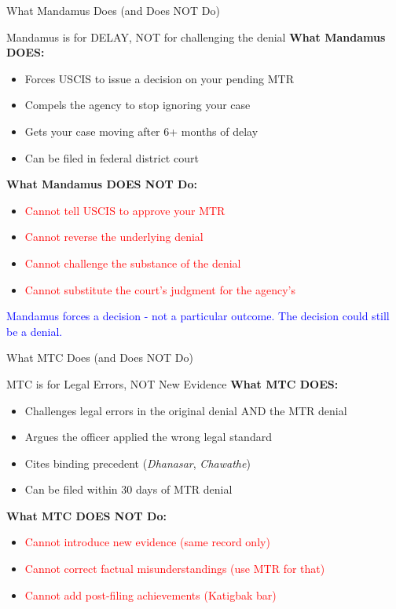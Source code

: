 \documentclass[11pt]{beamer}
\begin{document}
	\begin{frame}{What Mandamus Does (and Does NOT Do)}
		\scriptsize
		\begin{block}{Mandamus is for DELAY, NOT for challenging the denial}
			\textbf{What Mandamus DOES:}
			\begin{itemize}
				\item Forces USCIS to issue a decision on your pending MTR
				\item Compels the agency to stop ignoring your case
				\item Gets your case moving after 6+ months of delay
				\item Can be filed in federal district court
			\end{itemize}
			\textbf{What Mandamus DOES NOT Do:}
			\begin{itemize}
				\item \textcolor{red}{Cannot tell USCIS to approve your MTR}
				\item \textcolor{red}{Cannot reverse the underlying denial}
				\item \textcolor{red}{Cannot challenge the substance of the denial}
				\item \textcolor{red}{Cannot substitute the court's judgment for the agency's}
			\end{itemize}
			\textcolor{blue}{Mandamus forces a decision - not a particular outcome. The decision could still be a denial.}
		\end{block}
	\end{frame}
	
	\begin{frame}{What MTC Does (and Does NOT Do)}
		\scriptsize
		\begin{block}{MTC is for Legal Errors, NOT New Evidence}
			\textbf{What MTC DOES:}
			\begin{itemize}
				\item Challenges legal errors in the original denial AND the MTR denial
				\item Argues the officer applied the wrong legal standard
				\item Cites binding precedent (\textit{Dhanasar}, \textit{Chawathe})
				\item Can be filed within 30 days of MTR denial
			\end{itemize}
			\textbf{What MTC DOES NOT Do:}
			\begin{itemize}
				\item \textcolor{red}{Cannot introduce new evidence (same record only)}
				\item \textcolor{red}{Cannot correct factual misunderstandings (use MTR for that)}
				\item \textcolor{red}{Cannot add post-filing achievements (Katigbak bar)}
			\end{itemize}
		\end{block}
	\end{frame}
	
\end{document}
